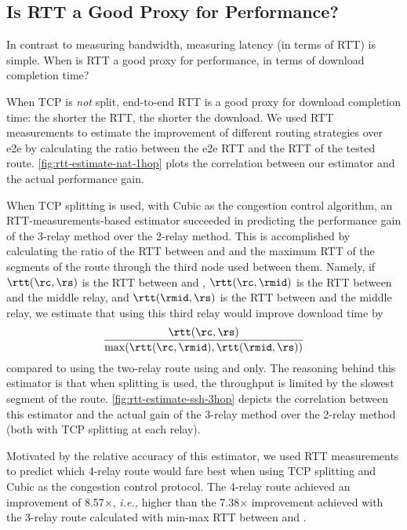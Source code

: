 \documentclass[newfonts=false,format=sigconf,anonymous,10pt,letterpaper]{acmart}
\providecommand{\ie}{\emph{i.e.,} }
\begin{document}
\subsection{Is RTT a Good Proxy for Performance?}

In contrast to measuring bandwidth, measuring latency (in terms of RTT) is simple. When is RTT a good proxy for performance, in terms of download completion time?

 When TCP is \emph{not} split, end-to-end RTT is a good proxy for download completion time: the shorter the RTT, the shorter the download. We used RTT measurements to estimate the improvement of different routing strategies over e2e by calculating the ratio between the e2e RTT and the RTT of the tested route. \autoref{fig:rtt-estimate-nat-1hop} plots the correlation between our estimator and the actual performance gain. %

 When TCP splitting is used, with Cubic as the congestion control algorithm, an RTT-measurements-based estimator succeeded in predicting the performance gain of the 3-relay method over the 2-relay method. This is accomplished by calculating the ratio of the RTT between \rc and \rs and the maximum RTT of the segments of the route through the third node used between them. Namely, if $\rtt(\rc,\rs)$ is the RTT between \rc and \rs, $\rtt(\rc,\rmid)$ is the RTT between \rc and the middle relay, and $\rtt(\rmid,\rs)$ is the RTT between \rs and the middle relay, we estimate that using this third relay would improve download time by 
\[
\frac{\rtt(\rc,\rs)}{\max(\rtt(\rc,\rmid),\rtt(\rmid,\rs))}
\]
compared to using the two-relay route using \rc and \rs only.
The reasoning behind this estimator is that when splitting is used, the throughput is limited by the slowest segment of the route. \autoref{fig:rtt-estimate-ssh-3hop} depicts the correlation between this estimator and the actual gain of the 3-relay method over the 2-relay method (both with TCP splitting at each relay).

Motivated by the relative accuracy of this estimator, we used RTT measurements to predict which 4-relay route would fare best when using TCP splitting and Cubic as the congestion control protocol. The 4-relay route achieved an improvement of 8.57$\times$, \ie higher than the 7.38$\times$ improvement achieved with the 3-relay route calculated with min-max RTT between \rc and \rs. 
 
\end{document}
